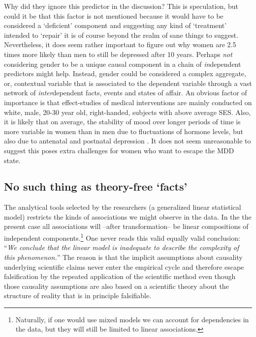 \documentclass[12pt,]{book}
\let\rmarkdownfootnote\footnote%
\def\footnote{\protect\rmarkdownfootnote}
\begin{document}
Why did they ignore this predictor in the discussion? This is speculation, but could it be that this factor is not mentioned because it would have to be considered a `deficient' component and suggesting any kind of `treatment' intended to `repair' it is of course beyond the realm of sane things to suggest. Nevertheless, it does seem rather important to figure out why women are 2.5 times more likely than men to still be depressed after 10 years. Perhaps \emph{not} considering gender to be a unique causal component in a chain of \emph{in}dependent predictors might help. Instead, gender could be considered a complex aggregate, or, contextual variable that is associated to the dependent variable through a vast network of \emph{inter}dependent facts, events and states of affair. An obvious factor of importance is that effect-studies of medical interventions are mainly conducted on white, male, 20-30 year old, right-handed, subjects with above average SES. Also, it is likely that on average, the stability of mood over longer periods of time is more variable in women than in men due to fluctuations of hormone levels, but also due to antenatal and postnatal depression \citep{world2002a}. It does not seem unreasonable to suggest this poses extra challenges for women who want to escape the MDD state.

\hypertarget{no-such-thing-as-theory-free-facts}{%
\subsection*{No such thing as theory-free `facts'}\label{no-such-thing-as-theory-free-facts}}

The analytical tools selected by the researchers (a generalized linear statistical model) restricts the kinds of associations we might observe in the data. In the the present case all associations will --after transformation-- be linear compositions of independent components.\footnote{Naturally, if one would use mixed models we can account for dependencies in the data, but they will still be limited to linear associations.} One never reads this valid equally valid conclusion: ``\emph{We conclude that the linear model is inadequate to describe the complexity of this phenomenon.}'' The reason is that the implicit assumptions about causality underlying scientific claims never enter the empirical cycle and therefore escape falsification by the repeated application of the scientific method even though those causality assumptions are also based on a scientific theory about the structure of reality that is in principle falsifiable.
\end{document}
